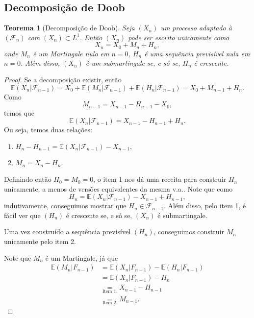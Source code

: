 \documentclass[12pt,a4paper,oneside]{book}
\newtheorem{theorem}{Teorema}[section]
\theoremstyle{definition}
\theoremstyle{remark}
\numberwithin{equation}{section}
\newcommand{\E}{\mathbb{E}}
\newcommand{\F}{\mathcal{F}}
\begin{document}
\subsection{Decomposição de Doob}

\begin{tcolorbox}
\begin{theorem}[Decomposição de Doob] \label{teo-decomp-Doob} Seja $(X_n)$ um processo adaptado à $(\F_n)$ com $(X_n) \subset L^1$. Então $(X_n)$ pode ser escrito unicamente como
$$X_n =X_0 +  M_n + H_n, $$
onde $M_n$ é um Martingale nulo em $n=0$, $H_n$ é uma sequência previsível nula em $n=0$. Além disso, $(X_n)$ é um submartingale se, e só se, $H_n$ é crescente.
\end{theorem}
\end{tcolorbox}

\begin{proof}
Se a decomposição existir, então
$$\E(X_n|\F_{n-1}) = X_0+ \E(M_n|\F_{n-1}) + \E(H_n|\F_{n-1}) =X_0+  M_{n-1} + H_n. $$
Como 
$$ M_{n-1} = X_{n-1} - H_{n-1}-X_0, $$
temos que
$$\E(X_n|\F_{n-1}) = X_{n-1} - H_{n-1} + H_n .$$
Ou seja, temos duas relações:
\begin{enumerate}
\item $H_n - H_{n-1} = \E(X_n|\F_{n-1}) -X_{n-1}$,
\item $M_n= X_n - H_n.$ 
\end{enumerate}
Definindo então $H_0=M_0 = 0$, o item 1 nos dá uma receita para construir $H_n$ unicamente, a menos de versões equivalentes da mesma v.a.. Note que como
$$H_n = \E(X_n|\F_{n-1}) - X_{n-1 } + H_{n-1}, $$
indutivamente, conseguimos mostrar que $H_n\in \F_{n-1}$.
Além disso, pelo item 1, é fácil ver  que $(H_n)$ é crescente se, e só se, $(X_n)$ é submartingale.

Uma vez construído a sequência previsível $(H_n)$, conseguimos construir $M_n$ unicamente pelo item 2. 

Note que $M_n$ é um Martingale,  já que
\begin{align*}
\E(M_n|F_{n-1}) &=  \E(X_n|F_{n-1})-\E(H_n|F_{n-1})\\
& =  \E(X_n|F_{n-1}) - H_n\\
& \underset{\textrm{Item 1.}}{=} X_{n-1}-H_{n-1} \\
& \underset{\textrm{Item 2.}}{=} M_{n-1}. 
\end{align*}

\end{proof}
\end{document}

